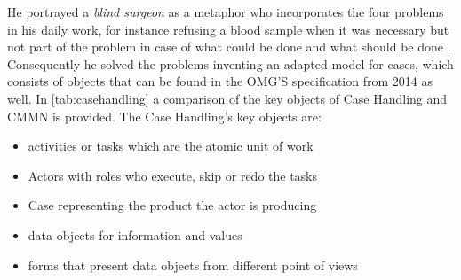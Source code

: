 He portrayed a \textit{blind surgeon} as a metaphor who incorporates the four problems in his daily work, for instance refusing a blood sample when it was necessary but not part of the problem in case of what could be done and what should be done \cite{aalst2003}.
Consequently he solved the problems inventing an adapted model for cases, which consists of objects that can be found in the OMG'S specification from 2014 as well. In \ref{tab:casehandling} a comparison of the key objects of Case Handling and CMMN is provided. The Case Handling's key objects are:
\begin{itemize}
\item activities or tasks which are the atomic unit of work
\item Actors with roles who execute, skip or redo the tasks
\item Case representing the product the actor is producing 
\item data objects for information and values 
\item forms that present data objects from different point of views 
\end{itemize}
\begin{table}[]
\centering
\caption{Comparison CMMN and Case Handling Model}
\label{tab:casehandling}
\end{table}

